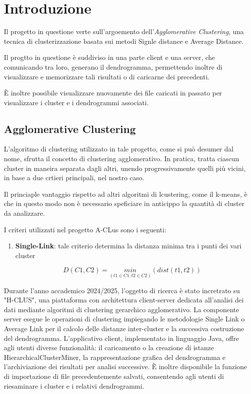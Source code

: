 \section{Introduzione}

Il progetto in questione verte sull'argoemento dell'\textit{Agglomerative Clustering}, una tecnica di clusterizzazione basata sui metodi Signle distance e Average Distance. 

Il progtto in questione è suddiviso in una parte client e una server, che comunicando tra loro, generano il dendrogramma, permettendo inoltre di visualizzare e memorizzare tali risultati o di caricarne dei precedenti.

È inoltre possibile visualizzare nuovamente dei file caricati in passato per visualizzare i cluster e i dendrogrammi associati. 


\subsection{Agglomerative Clustering}

L'algoritmo di clustering utilizzato in tale progetto, come si può desumer dal nome, sfrutta il concetto di clustering agglomerativo. In pratica, tratta ciascun cluster in maneira separata dagli altri, unendo progressivamente quelli più vicini, in base a due crtieri principali, nel nostro caso.

Il princiaple vantaggio  rispetto ad altri algoritmi di lcustering, come il k-means, è che in questo modo non è necessario speficiare in anticippo la quantità di cluster da analizzare. 

I criteri utilizzati nel progetto A-CLus sono i seguenti: 

\begin{enumerate}
    \item \textbf{Single-Link}: tale criterio determina la distanza minima tra i punti dei vari cluster

    \begin{equation}
        D\left(C1,C2\right) = \underset{\left(t1 \in C1,t2 \in C2\right)}{min}\left( dist\left(t1,t2\right)\right)
    \end{equation}
\end{enumerate}


Durante l'anno accademico 2024/2025, l'oggetto di ricerca è stato incretrato su "H-CLUS", una piattaforma con architettura client-server dedicata all'analisi dei dati mediante algoritmi di clustering gerarchico agglomerativo. La componente server esegue le operazioni di clustering impiegando le metodologie Single Link o Average Link per il calcolo delle distanze inter-cluster e la successiva costruzione del dendrogramma. L'applicativo client, implementato in linguaggio Java, offre agli utenti diverse funzionalità: il caricamento o la creazione di istanze HierarchicalClusterMiner, la rappresentazione grafica del dendrogramma e l'archiviazione dei risultati per analisi successive. È inoltre disponibile la funzione di importazione di file precedentemente salvati, consentendo agli utenti di riesaminare i cluster e i relativi dendrogrammi. 

